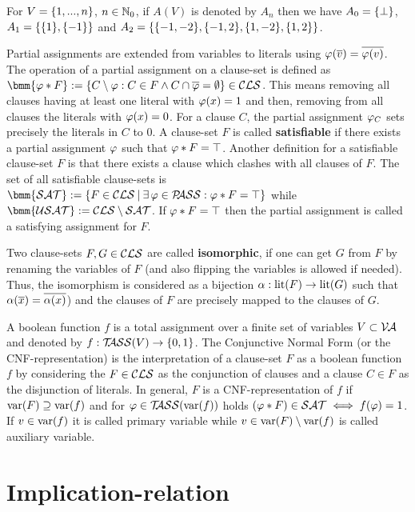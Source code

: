 \documentclass{report}
\begin{document}
\begin{examp}\label{exp:An}
For $V=\{ 1,..., n \}$, $n \in \mathbb{N}_0$, if $A(V)$ is denoted by $A_n$ then we have $A_0 = \{ \bot \}$, $A_1 = \{ \{ 1 \},\{ -1 \} \}$ and $A_2 = \{ \{ -1,-2 \},\{ -1,2 \},\{ 1,-2 \},\{ 1,2 \} \}$.
\end{examp}

Partial assignments are extended from variables to literals using $\varphi(\overline{v})=\overline{\varphi(v)}$. The operation of a partial assignment on a clause-set is defined as $\bmm{\vp * F} := \set{C \sm \vp : C \in F \wedge C \cap \ol{\vp} = \es} \in \Cls$. This means removing all clauses having at least one literal with $\varphi (x)=1$ and then, removing from all clauses the literals with $\varphi (x)=0$. For a clause $C$, the partial assignment $\varphi_C$ sets precisely the literals in $C$ to 0. A clause-set $F$ is called \textbf{satisfiable} if there exists a partial assignment $\varphi$ such that $\varphi * F = \top$. Another definition for a satisfiable clause-set $F$ is that there exists a clause which clashes with all clauses of $F$. The set of all satisfiable clause-sets is $\bmm{\Sat} := \set{F \in \Cls \mb \ex\, \vp \in \Pass : \vp * F = \top}$ while $\bmm{\Usat} := \Cls \sm \Sat$. If $\varphi * F = \top$ then the partial assignment is called a satisfying assignment for $F$.

Two clause-sets $F, G \in \mathcal{CLS}$ are called \textbf{isomorphic}, if one can get $G$ from $F$ by renaming the variables of $F$ (and also flipping the variables is allowed if needed). Thus, the isomorphism is considered as a bijection $\alpha: \operatorname{lit}(F) \rightarrow \operatorname{lit}(G)$ such that $\alpha(\overline{x}) = \overline{\alpha(x)}$) and the clauses of $F$ are precisely mapped to the clauses of $G$. 

A boolean function $f$ is a total assignment over a finite set of variables $V \subset \mathcal{V\hspace{-0.1em}A}$ and denoted by $f:  \mathcal{T\hspace{-0.35em}ASS}(V) \rightarrow \{ 0,1 \}$. The Conjunctive Normal Form (or the CNF-representation) is the interpretation of a clause-set $F$ as a boolean function $f$ by considering the $F \in \mathcal{CLS}$ as the conjunction of clauses and a clause $C \in F$ as the disjunction of literals. In general, $F$ is a CNF-representation of $f$ if $\operatorname{var}(F) \supseteq \operatorname{var}(f)$ and for $\varphi \in \mathcal{T\hspace{-0.35em}ASS}(\operatorname{var}(f))$ holds $(\varphi * F) \in \mathcal{SAT} \iff f(\varphi) = 1$. If $v \in \operatorname{var}(f)$ it is called primary variable while $v \in \operatorname{var}(F) \setminus \operatorname{var}(f)$ is called auxiliary variable.

\section{Implication-relation}
\label{sec:imprel}
\end{document}

